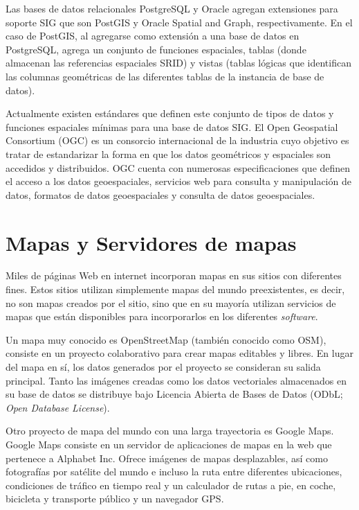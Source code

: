 Las bases de datos relacionales PostgreSQL y Oracle agregan extensiones para soporte SIG que son PostGIS y Oracle Spatial and Graph, respectivamente. En el caso de PostGIS, al agregarse como extensión a una base de datos en PostgreSQL, agrega un conjunto de funciones espaciales, tablas (donde almacenan las referencias espaciales SRID) y vistas (tablas lógicas que identifican las columnas geométricas de las diferentes tablas de la instancia de base de datos).

Actualmente existen estándares que definen este conjunto de tipos de datos y funciones espaciales mínimas para una base de datos SIG. El Open Geospatial Consortium (OGC) es un consorcio internacional de la industria cuyo objetivo es tratar de estandarizar la forma en que los datos geométricos y espaciales son accedidos y distribuidos. OGC cuenta con numerosas especificaciones que definen el acceso a los datos geoespaciales, servicios web para consulta y manipulación de datos, formatos de datos geoespaciales y consulta de datos geoespaciales.

\section{Mapas y Servidores de mapas}

Miles de páginas Web en internet incorporan mapas en sus sitios con diferentes fines. Estos sitios utilizan simplemente mapas del mundo preexistentes, es decir, no son mapas creados por el sitio, sino que en su mayoría utilizan servicios de mapas que están disponibles para incorporarlos en los diferentes \textit{software}.

Un mapa muy conocido es OpenStreetMap (también conocido como OSM), consiste en un proyecto colaborativo para crear mapas editables y libres. En lugar del mapa en sí, los datos generados por el proyecto se consideran su salida principal. Tanto las imágenes creadas como los datos vectoriales almacenados en su base de datos se distribuye bajo Licencia Abierta de Bases de Datos (ODbL; \textit{Open Database License}).

Otro proyecto de mapa del mundo con una larga trayectoria es Google Maps. Google Maps consiste en un servidor de aplicaciones de mapas en la web que pertenece a Alphabet Inc. Ofrece imágenes de mapas desplazables, así como fotografías por satélite del mundo e incluso la ruta entre diferentes ubicaciones, condiciones de tráfico en tiempo real y un calculador de rutas a pie, en coche, bicicleta y transporte público y un navegador GPS.

